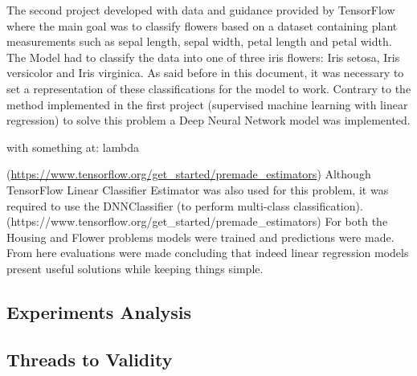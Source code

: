 The second project developed with data and guidance provided by TensorFlow where the main goal was to classify flowers based on a dataset containing plant measurements such as sepal length, sepal width, petal length and petal width. The Model had to classify the data into one of three iris flowers: Iris setosa, Iris versicolor and Iris virginica.  As said before in this document, it was necessary to set a representation of these classifications for the model to work. Contrary to the method implemented in the first project (supervised machine learning with linear regression) to solve this problem a Deep Neural Network model was implemented. 

\begin{tensorflow}[caption={ads}]
with something at: lambda

\end{tensorflow}



(\url{https://www.tensorflow.org/get\_started/premade\_estimators})
Although TensorFlow Linear Classifier Estimator was also used for this problem, it was required to use the DNNClassifier (to perform multi-class classification). (https://www.tensorflow.org/get\_started/premade\_estimators)
For both the Housing and Flower problems models were trained and predictions were made.  From here evaluations were made concluding that indeed linear regression models present useful solutions while keeping things simple. 



\subsection{Experiments Analysis}



\subsection{Threads to Validity}



\endinput



